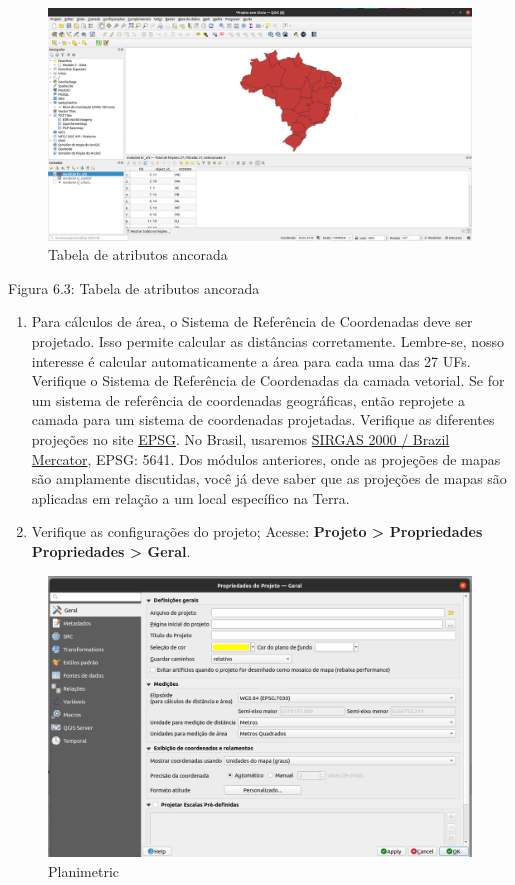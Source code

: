\documentclass[
  portuguese,
]{krantz}
\begin{document}
\begin{figure}
\centering
\includegraphics{media/modulo6/docked-attribute-tab.png}
\caption{Tabela de atributos ancorada}
\end{figure}

Figura 6.3: Tabela de atributos ancorada

\begin{enumerate}
\def\labelenumi{\arabic{enumi}.}
\setcounter{enumi}{2}
\item
  Para cálculos de área, o Sistema de Referência de Coordenadas deve ser projetado. Isso permite calcular as distâncias corretamente. Lembre-se, nosso interesse é calcular automaticamente a área para cada uma das 27 UFs. Verifique o Sistema de Referência de Coordenadas da camada vetorial. Se for um sistema de referência de coordenadas geográficas, então reprojete a camada para um sistema de coordenadas projetadas. Verifique as diferentes projeções no site \href{https://epsg.io/?q=Brazil+kind\%3APROJCRS}{EPSG}. No Brasil, usaremos \href{https://epsg.io/5641}{SIRGAS 2000 / Brazil Mercator}, EPSG: 5641. Dos módulos anteriores, onde as projeções de mapas são amplamente discutidas, você já deve saber que as projeções de mapas são aplicadas em relação a um local específico na Terra.
\item
  Verifique as configurações do projeto; Acesse: \textbf{Projeto \textgreater{} Propriedades Propriedades \textgreater{} Geral}.
\end{enumerate}

\begin{figure}
\centering
\includegraphics{media/modulo6/gen-settings.png}
\caption{Planimetric}
\end{figure}
\end{document}
